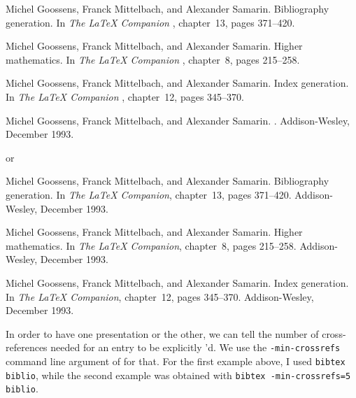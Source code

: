 \medskip
\begin{myex}
\begin{thebibliography}{1}

Michel Goossens, Franck Mittelbach, and Alexander Samarin.
\newblock Bibliography generation.
\newblock In {\em The {{\LaTeX}} {C}ompanion\/} \cite{companion4}, chapter~13,
  pages 371--420.

Michel Goossens, Franck Mittelbach, and Alexander Samarin.
\newblock Higher mathematics.
\newblock In {\em The {{\LaTeX}} {C}ompanion\/} \cite{companion4}, chapter~8,
  pages 215--258.

Michel Goossens, Franck Mittelbach, and Alexander Samarin.
\newblock Index generation.
\newblock In {\em The {{\LaTeX}} {C}ompanion\/} \cite{companion4}, chapter~12,
  pages 345--370.

Michel Goossens, Franck Mittelbach, and Alexander Samarin.
.
\newblock Addison-Wesley, December 1993.

\end{thebibliography}
\end{myex}

\medskip \noindent or\medskip

\begin{myex}
\begin{thebibliography}{1}

Michel Goossens, Franck Mittelbach, and Alexander Samarin.
\newblock Bibliography generation.
\newblock In {\em The {{\LaTeX}} {C}ompanion}, chapter~13, pages 371--420.
  Addison-Wesley, December 1993.

Michel Goossens, Franck Mittelbach, and Alexander Samarin.
\newblock Higher mathematics.
\newblock In {\em The {{\LaTeX}} {C}ompanion}, chapter~8, pages 215--258.
  Addison-Wesley, December 1993.

Michel Goossens, Franck Mittelbach, and Alexander Samarin.
\newblock Index generation.
\newblock In {\em The {{\LaTeX}} {C}ompanion}, chapter~12, pages 345--370.
  Addison-Wesley, December 1993.

\end{thebibliography}
\end{myex}

In order to have one presentation or the other, we can tell \bt the
number of cross-references needed for an entry to be explicitly
'd. We use the \verb+-min-crossrefs+ command line argument
of \bt for that. 
For the first example above, I used
\verb+bibtex biblio+, 
while the second example was obtained with
\verb+bibtex -min-crossrefs=5 biblio+.


